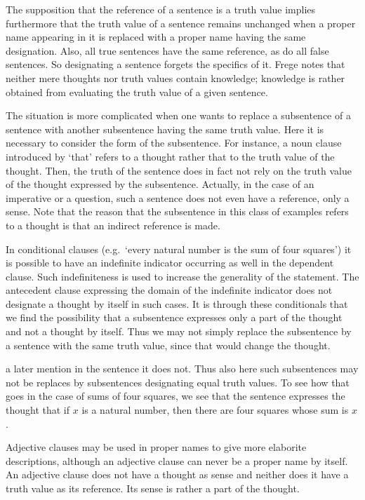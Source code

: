 \documentclass{article}
\begin{document}
The supposition that the reference of a sentence is a truth value implies furthermore that the truth value of a sentence remains unchanged when a proper name appearing in it is replaced with a proper name having the same designation. Also, all true sentences have the same reference, as do all false sentences. So designating a sentence forgets the specifics of it. Frege notes that neither mere thoughts nor truth values contain knowledge; knowledge is rather obtained from evaluating the truth value of a given sentence.

The situation is more complicated when one wants to replace a subsentence of a sentence with another subsentence having the same truth value. Here it is necessary to consider the form of the subsentence. For instance, a noun clause introduced by `that' refers to a thought rather that to the truth value of the thought. Then, the truth of the sentence does in fact not rely on the truth value of the thought expressed by the subsentence. Actually, in the case of an imperative or a question, such a sentence does not even have a reference, only a sense. Note that the reason that the subsentence in this class of examples refers to a thought is that an indirect reference is made. 

In conditional clauses (e.g.~`every natural number is the sum of four squares') it is possible to have an indefinite indicator occurring as well in the dependent clause. Such indefiniteness is used to increase the generality of the statement. The antecedent clause expressing the domain of the indefinite indicator does not designate a thought by itself in such cases. It is through these conditionals that we find the possibility that a subsentence expresses only a part of the thought and not a thought by itself. Thus we may not simply replace the subsentence by a sentence with the same truth value, since that would change the thought. 

a later mention in the sentence it does not. Thus also here such subsentences may not be replaces by subsentences designating equal truth values. To see how that goes in the case of sums of four squares, we see that the sentence expresses the thought that if $x$ is a natural number, then there are four squares whose sum is $x$.

Adjective clauses may be used in proper names to give more elaborite descriptions, although an adjective clause can never be a proper name by itself. An adjective clause does not have a thought as sense and neither does it have a truth value as its reference. Its sense is rather a part of the thought. 
\end{document}
